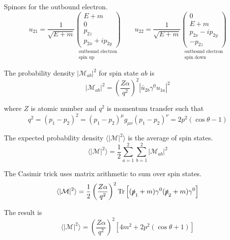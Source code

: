 Spinors for the outbound electron.
\begin{equation*}
u_{21}=\frac{1}{\sqrt{E+m}}
\underset{\substack{\text{outbound electron}\\ \text{spin up}}}
{\begin{pmatrix}E+m\\0\\p_{2z}\\p_{2x}+ip_{2y}\end{pmatrix}}
\qquad
u_{22}=\frac{1}{\sqrt{E+m}}
\underset{\substack{\text{outbound electron}\\ \text{spin down}}}
{\begin{pmatrix}0\\E+m\\p_{2x}-ip_{2y}\\-p_{2z}\end{pmatrix}}
\end{equation*}

The probability density $|\mathcal M_{ab}|^2$ for spin state $ab$ is
\begin{equation*}
|\mathcal{M}_{ab}|^2=\left(\frac{Z\alpha}{q^2}\right)^2\left|\bar{u}_{2b}\gamma^0 u_{1a}\right|^2
\end{equation*}

where $Z$ is atomic number and $q^2$ is momentum transfer such that
\begin{equation*}
q^2=(p_1-p_2)^2=(p_1-p_2)^\mu g_{\mu\nu}(p_1-p_2)^\nu=2p^2(\cos\theta-1)
\end{equation*}

The expected probability density
$\langle\vert\mathcal{M}\vert^2\rangle$
is the average of spin states.
\begin{equation*}
\langle\vert\mathcal{M}\vert^2\rangle
=\frac{1}{2}\sum_{a=1}^2\sum_{b=1}^2\left|\mathcal{M}_{ab}\right|^2
\end{equation*}

The Casimir trick uses matrix arithmetic to sum over spin states.
\begin{equation*}
\langle\vert\mathcal{M}\vert^2\rangle
=\frac{1}{2}\left(\frac{Z\alpha}{q^2}\right)^2
\operatorname{Tr}\left[(\slashed{p}_1+m)\gamma^0(\slashed{p}_2+m)\gamma^0\right]
\end{equation*}

The result is
\begin{equation*}
\langle\vert\mathcal{M}\vert^2\rangle
=\left(\frac{Z\alpha}{q^2}\right)^2\left[4m^2+2p^2(\cos\theta+1)\right]
\end{equation*}

